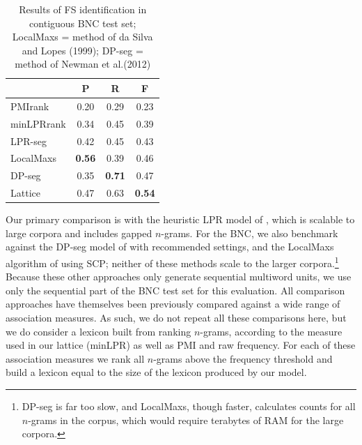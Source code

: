 \documentclass[11pt,letterpaper]{article}
\makeatletter
\def \al {al.\@ }
\makeatother
\begin{document}
 \begin{table}[!bt]
 
 \begin{center}
	
	 \begin{tabular}{lccc}

       \toprule
			& P & R & F\\
			 \midrule
			PMIrank & 0.20 & 0.29 & 0.23 \\
			minLPRrank & 0.34 & 0.45 & 0.39 \\
			LPR-seg & 0.42 & 0.45 & 0.43 \\
			LocalMaxs & \bf{0.56} & 0.39 & 0.46 \\
			DP-seg & 0.35 & \bf{0.71} & 0.47 \\
  \midrule
			Lattice & 0.47 & 0.63 & \bf{0.54} \\
       \bottomrule
 \end{tabular}
  \caption{ Results of FS identification in contiguous BNC test set; LocalMaxs = method of da Silva and Lopes (1999); DP-seg = method of Newman et \al (2012)}
	\label{tab:BNC}

 \end{center}

 \end{table}	



 Our primary comparison is with the heuristic LPR model of , which is scalable to large corpora and includes gapped $n$-grams. For the BNC, we also benchmark against the DP-seg model of  with recommended settings, and the LocalMaxs algorithm of  using SCP; neither of these methods scale to the larger corpora.\footnote{DP-seg is far too slow, and LocalMaxs, though faster, calculates counts for all $n$-grams in the corpus, which would require terabytes of RAM for the large corpora.} Because these other approaches only generate sequential multiword units, we use only the sequential part of the BNC test set for this evaluation. All comparison approaches have themselves been previously compared against a wide range of association measures. As such, we do not repeat all these comparisons here, but we do consider a lexicon built from ranking $n$-grams, according to the measure used in our lattice (minLPR) as well as PMI and raw frequency. For each of these association measures we rank all $n$-grams above the frequency threshold and build a lexicon equal to the size of the lexicon produced by our model.
\end{document}
